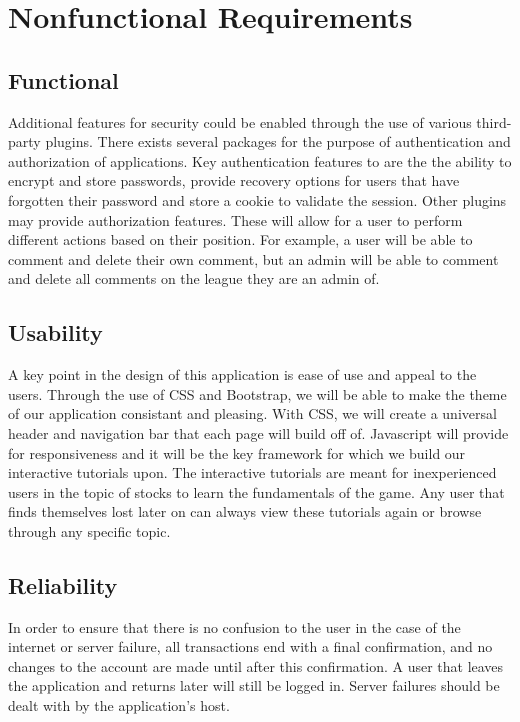 \section{Nonfunctional Requirements}

\subsection{Functional}
Additional features for security could be enabled through the use of various third-party plugins. There exists several packages for the purpose of authentication and authorization of applications. 
Key authentication features to are the the ability to encrypt and store passwords, provide recovery options for users that have forgotten their password and store a cookie to validate the session. 
Other plugins may provide authorization features. These will allow for a user to perform different actions based on their position. For example, a user will be able to comment and delete their own comment, but an admin will be able to comment and delete all comments on the league they are an admin of.


\subsection{Usability}
A key point in the design of this application is ease of use and appeal to the users. Through the use of CSS and Bootstrap, we will be able to make the theme of our application consistant and pleasing. With CSS, we will create a universal header and navigation bar that each page will build off of. Javascript will provide for responsiveness and it will be the key framework for which we build our interactive tutorials upon. The interactive tutorials are meant for inexperienced users in the topic of stocks to learn the fundamentals of the game. Any user that finds themselves lost later on can always view these tutorials again or browse through any specific topic.


\subsection{Reliability}
In order to ensure that there is no confusion to the user in the case of the internet or server failure, all transactions end with a final confirmation, and no changes to the account are made until after this confirmation. A user that leaves the application and returns later will still be logged in. Server failures should be dealt with by the application's host.


